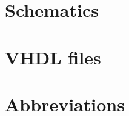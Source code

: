 \appendix
\section{Schematics}
\label{sec:schematics}

\newpage

\section{VHDL files}
\label{sec:VHDL}
\newpage

\section{Abbreviations}
\label{sec:abbreviations}
 \newpage
